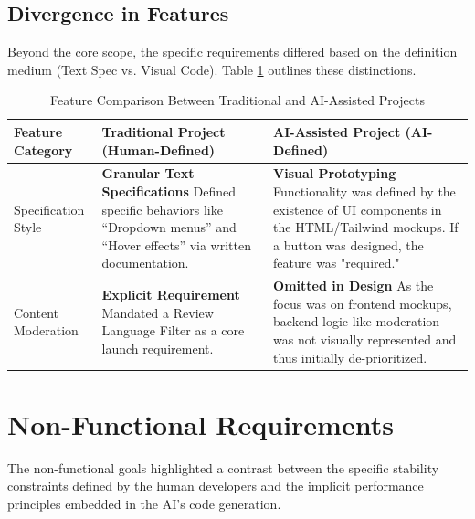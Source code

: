 \documentclass[a4paper,12pt]{report}
\begin{document}
\subsection{Divergence in Features}

Beyond the core scope, the specific requirements differed based on the definition medium (Text Spec vs. Visual Code). Table \ref{tab:feature-comparison} outlines these distinctions.

\begin{table}[h]
\centering
\caption{Feature Comparison Between Traditional and AI-Assisted Projects}
\begin{tabularx}{\textwidth}{|l|X|X|}
\hline
\textbf{Feature Category} & \textbf{Traditional Project (Human-Defined)} & \textbf{AI-Assisted Project (AI-Defined)} \\ \hline
Specification Style & \textbf{Granular Text Specifications} \newline Defined specific behaviors like ``Dropdown menus'' and ``Hover effects'' via written documentation. & \textbf{Visual Prototyping} \newline Functionality was defined by the existence of UI components in the HTML/Tailwind mockups. If a button was designed, the feature was "required." \\ \hline
Content Moderation & \textbf{Explicit Requirement} \newline Mandated a Review Language Filter as a core launch requirement. & \textbf{Omitted in Design} \newline As the focus was on frontend mockups, backend logic like moderation was not visually represented and thus initially de-prioritized. \\ \hline
\end{tabularx}
\label{tab:feature-comparison}
\end{table}

\section{Non-Functional Requirements}

The non-functional goals highlighted a contrast between the specific stability constraints defined by the human developers and the implicit performance principles embedded in the AI's code generation.
\end{document}

